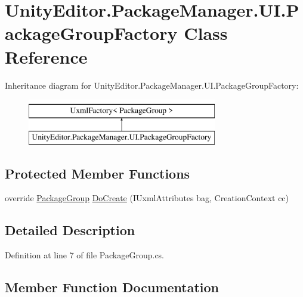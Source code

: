 \hypertarget{class_unity_editor_1_1_package_manager_1_1_u_i_1_1_package_group_factory}{}\section{Unity\+Editor.\+Package\+Manager.\+U\+I.\+Package\+Group\+Factory Class Reference}
\label{class_unity_editor_1_1_package_manager_1_1_u_i_1_1_package_group_factory}
Inheritance diagram for Unity\+Editor.\+Package\+Manager.\+U\+I.\+Package\+Group\+Factory\+:\begin{figure}[H]
\begin{center}
\leavevmode
\includegraphics[height=2.000000cm]{class_unity_editor_1_1_package_manager_1_1_u_i_1_1_package_group_factory}
\end{center}
\end{figure}
\subsection*{Protected Member Functions}
\begin{DoxyCompactItemize}
\item 
override \mbox{\hyperlink{class_unity_editor_1_1_package_manager_1_1_u_i_1_1_package_group}{Package\+Group}} \mbox{\hyperlink{class_unity_editor_1_1_package_manager_1_1_u_i_1_1_package_group_factory_a86b0f104d5a9640ade0ef9081ead7036}{Do\+Create}} (I\+Uxml\+Attributes bag, Creation\+Context cc)
\end{DoxyCompactItemize}


\subsection{Detailed Description}


Definition at line 7 of file Package\+Group.\+cs.



\subsection{Member Function Documentation}
\mbox{\label{class_unity_editor_1_1_package_manager_1_1_u_i_1_1_package_group_factory_a86b0f104d5a9640ade0ef9081ead7036}} 
